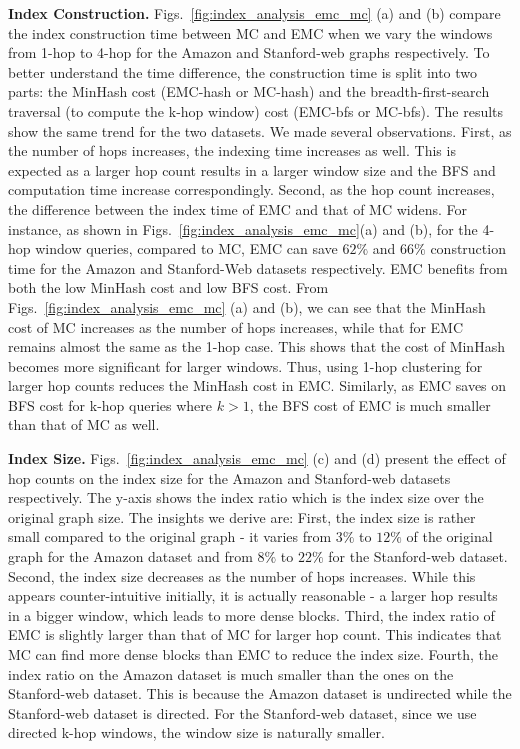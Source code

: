 \textbf{Index Construction. } Figs.~\ref{fig:index_analysis_emc_mc} 
(a) and (b) compare the index construction time between MC and EMC 
when we vary the windows from 1-hop to 4-hop for the Amazon and Stanford-web 
graphs respectively. To better understand the time difference, 
the construction time is split into two parts: 
the MinHash cost (EMC-hash or MC-hash) and the breadth-first-search traversal (to compute the k-hop window)  cost (EMC-bfs or MC-bfs). The results show the same trend 
for the two datasets. We made several observations.
First, as the number of hops increases, the indexing time increases as well. 
This is expected as a larger hop count results in a larger window size 
and the BFS and computation time increase correspondingly. 
Second, as the hop count increases, the difference between the
index time of EMC and that of MC widens. 
For instance, as shown in Figs.~\ref{fig:index_analysis_emc_mc}(a) and (b), for the 4-hop window queries, compared to MC, 
EMC can save $62\%$ and $66\%$ construction time for the Amazon and Stanford-Web datasets respectively.
EMC benefits from both the low MinHash cost and low BFS cost. 
From Figs.~\ref{fig:index_analysis_emc_mc} (a) and (b), 
we can see that the MinHash cost of MC increases as the number of hops 
increases, while that for EMC remains almost the same as the 1-hop case. 
This shows that the cost of MinHash becomes more significant for larger windows. 
Thus, using 1-hop clustering for larger hop counts reduces the MinHash cost 
in EMC. Similarly, as EMC saves on BFS cost for k-hop queries where $k > 1$, 
the BFS cost of EMC is much smaller than that of MC as well. 

\textbf{Index Size.} Figs.~\ref{fig:index_analysis_emc_mc} (c) and (d) 
present the effect of hop counts on the index size for the Amazon and Stanford-web 
datasets respectively. The y-axis shows the index ratio which is the index size over the original graph size. The insights we derive are: 
First, the index size is rather small compared to the original graph - it
varies from $3\%$ to $12\%$ of the original graph for the Amazon dataset 
and from $8\%$ to $22\%$ for the Stanford-web dataset. 
Second, the index size decreases as the number of hops increases. 
While this appears counter-intuitive initially, it is actually reasonable - a larger hop results in a bigger window, which leads
to more dense blocks. Third, the index ratio of EMC is slightly larger 
than that of MC for larger hop count. This indicates that MC can find more dense blocks 
than EMC to reduce the index size. Fourth, the index ratio on 
the Amazon dataset is much smaller than the ones on the Stanford-web dataset. 
This is because the Amazon dataset is undirected while the Stanford-web dataset
is directed. For the Stanford-web dataset, since we use directed k-hop windows, the window size is naturally smaller. 

